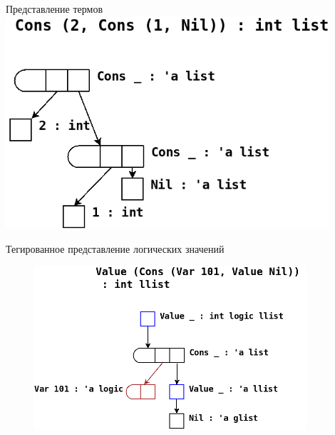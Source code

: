 \documentclass[10pt, mathserif]{beamer}
\theoremstyle{definition}
\begin{document}
\begin{frame}[fragile]{Представление термов}
  \centering
  \includegraphics[width=0.9\textwidth]{img1.png}
\end{frame}


\begin{frame}[fragile]{Тегированное представление логических значений}
  \begin{figure}
  \centering
  \includegraphics[width=0.9\textwidth]{img3.png}
  \end{figure}
\end{frame}
\end{document}
